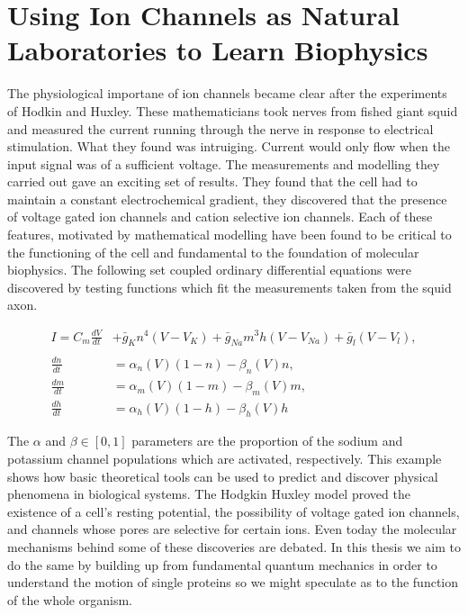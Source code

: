 \section{Using Ion Channels as Natural Laboratories to Learn Biophysics}
The physiological importane of ion channels became clear after the experiments of Hodkin and Huxley. These mathematicians took nerves from fished giant squid and measured the current running through the nerve in response to electrical stimulation. What they found was intruiging. Current would only flow when the input signal was of a sufficient voltage. The measurements and modelling they carried out gave an exciting set of results. They found that the cell had to maintain a constant electrochemical gradient, they discovered that the presence of voltage gated ion channels and cation selective ion channels\cite{hodgkin1952}. Each of these features, motivated by mathematical modelling have been found to be critical to the functioning of the cell and fundamental to the foundation of molecular biophysics. The following set coupled ordinary differential equations were discovered by testing functions which fit the measurements taken from the squid axon.   

\begin{equation}
\begin{aligned}
	I = C_m \frac{dV}{dt} &+ \bar{g}_K n^4 (V - V_K) + \bar{g}_{Na} m^3 h (V - V_{Na} ) + \bar{g}_l (V-V_l) ,  \\ \\
	\frac{dn}{dt} &= \alpha_n(V)  (1-n) - \beta_n(V)  n, \\
	\frac{dm}{dt} &= \alpha_m(V)  (1-m) - \beta_m(V)  m, \\ 
	\frac{dh}{dt} &= \alpha_h(V)  (1-h) - \beta_h(V)  h  
\end{aligned}
\end{equation}

The $\alpha$ and $\beta \in [0,1]$ parameters are the proportion of the sodium and potassium channel populations which are activated, respectively.  This example shows how basic theoretical tools can be used to predict and discover physical phenomena in biological systems. The Hodgkin Huxley model proved the existence of a cell's resting potential, the possibility of voltage gated ion channels, and channels whose pores are selective for certain ions. Even today the molecular mechanisms behind some of these discoveries are debated. In this thesis we aim to do the same by building up from fundamental quantum mechanics in order to understand the motion of single proteins so we might speculate as to the function of the whole organism.

